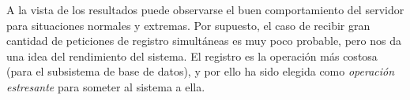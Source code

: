 A la vista de los resultados puede observarse el buen comportamiento del servidor para situaciones normales y extremas. Por supuesto, el caso de recibir gran cantidad de peticiones de registro simultáneas es muy poco probable, pero nos da una idea del rendimiento del sistema. El registro es la operación más costosa (para el subsistema de base de datos), y por ello ha sido elegida como \emph{operación estresante} para someter al sistema a ella.






